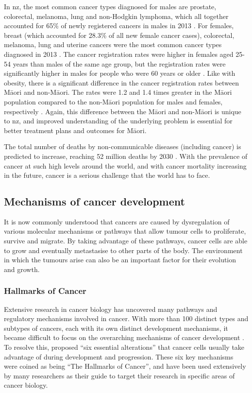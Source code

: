 In \gls{nz}, the most common cancer types diagnosed for males are prostate, colorectal, melanoma, lung and non-Hodgkin lymphoma, which all together accounted for 65\% of newly registered cancers in males in 2013 \citep{Health2016b}.
For females, breast (which accounted for 28.3\% of all new female cancer cases), colorectal, melanoma, lung and uterine cancers were the most common cancer types diagnosed in 2013 \citep{Health2016b}.
The cancer registration rates were higher in females aged 25-54 years than males of the same age group, but the registration rates were significantly higher in males for people who were 60 years or older \citep{Health2016b}.
Like with obesity, there is a significant difference in the cancer registration rates between M\=aori and non-M\=aori.
The rates were 1.2 and 1.4 times greater in the M\=aori population compared to the non-M\=aori population for males and females, respectively \citep{Health2016b}.
Again, this difference between the M\=aori and non-M\=aori is unique to \gls{nz}, and improved understanding of the underlying problem is essential for better treatment plans and outcomes for M\=aori.

The total number of deaths by non-communicable diseases (including cancer) is predicted to increase, reaching 52 million deaths by 2030 \citep{WHO2014}.
With the prevalence of cancer at such high levels around the world, and with cancer mortality increasing in the future, cancer is a serious challenge that the world has to face.

\subsection{Mechanisms of cancer development}
\label{sub:mechanisms_of_cancer_development}

It is now commonly understood that cancers are caused by dysregulation of various molecular mechanisms or pathways that allow tumour cells to proliferate, survive and migrate.
By taking advantage of these pathways, cancer cells are able to grow and eventually metastasise to other parts of the body.
The environment in which the tumours arise can also be an important factor for their evolution and growth.

\subsubsection{Hallmarks of Cancer}
\label{subsubsec:cancerhallmarks}

Extensive research in cancer biology has uncovered many pathways and regulatory mechanisms involved in cancer.
With more than 100 distinct types and subtypes of cancers, each with its own distinct development mechanisms, it became difficult to focus on the overarching mechanisms of cancer development \citep{Hanahan2000}.
To resolve this, \citet{Hanahan2000} proposed ``six essential alterations'' that cancer cells usually take advantage of during development and progression.
These six key mechanisms were coined as being ``The Hallmarks of Cancer'', and have been used extensively by many researchers as their guide to target their research in specific areas of cancer biology.

